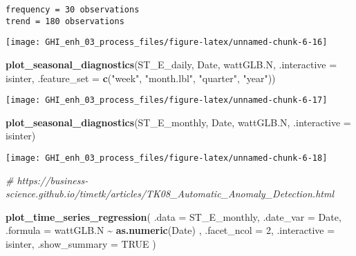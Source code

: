 \documentclass[
  10pt,
  a4paper,oneside]{article}
\newenvironment{Shaded}{\begin{snugshade}}{\end{snugshade}}
\newcommand{\AttributeTok}[1]{\textcolor[rgb]{0.13,0.29,0.53}{#1}}
\newcommand{\CommentTok}[1]{\textcolor[rgb]{0.56,0.35,0.01}{\textit{#1}}}
\newcommand{\ConstantTok}[1]{\textcolor[rgb]{0.56,0.35,0.01}{#1}}
\newcommand{\DecValTok}[1]{\textcolor[rgb]{0.00,0.00,0.81}{#1}}
\newcommand{\FunctionTok}[1]{\textcolor[rgb]{0.13,0.29,0.53}{\textbf{#1}}}
\newcommand{\NormalTok}[1]{#1}
\newcommand{\SpecialCharTok}[1]{\textcolor[rgb]{0.81,0.36,0.00}{\textbf{#1}}}
\newcommand{\StringTok}[1]{\textcolor[rgb]{0.31,0.60,0.02}{#1}}
\begin{document}
\begin{verbatim}
frequency = 30 observations
trend = 180 observations
\end{verbatim}

\begin{center}\texttt{[image: GHI\_enh\_03\_process\_files/figure-latex/unnamed-chunk-6-16]} \end{center}

\begin{Shaded}
\begin{Highlighting}[]
\FunctionTok{plot\_seasonal\_diagnostics}\NormalTok{(ST\_E\_daily, Date, wattGLB.N, }\AttributeTok{.interactive =}\NormalTok{ isinter,}
                          \AttributeTok{.feature\_set =} \FunctionTok{c}\NormalTok{(}\StringTok{"week"}\NormalTok{, }\StringTok{"month.lbl"}\NormalTok{, }\StringTok{"quarter"}\NormalTok{, }\StringTok{"year"}\NormalTok{))}
\end{Highlighting}
\end{Shaded}

\begin{center}\texttt{[image: GHI\_enh\_03\_process\_files/figure-latex/unnamed-chunk-6-17]} \end{center}

\begin{Shaded}
\begin{Highlighting}[]
\FunctionTok{plot\_seasonal\_diagnostics}\NormalTok{(ST\_E\_monthly, Date, wattGLB.N, }\AttributeTok{.interactive =}\NormalTok{ isinter)}
\end{Highlighting}
\end{Shaded}

\begin{center}\texttt{[image: GHI\_enh\_03\_process\_files/figure-latex/unnamed-chunk-6-18]} \end{center}

\begin{Shaded}
\begin{Highlighting}[]
\CommentTok{\# https://business{-}science.github.io/timetk/articles/TK08\_Automatic\_Anomaly\_Detection.html}

\FunctionTok{plot\_time\_series\_regression}\NormalTok{(}
    \AttributeTok{.data         =}\NormalTok{ ST\_E\_monthly,}
    \AttributeTok{.date\_var     =}\NormalTok{ Date,}
    \AttributeTok{.formula      =}\NormalTok{ wattGLB.N }\SpecialCharTok{\textasciitilde{}} \FunctionTok{as.numeric}\NormalTok{(Date)  ,}
    \AttributeTok{.facet\_ncol   =} \DecValTok{2}\NormalTok{,}
    \AttributeTok{.interactive  =}\NormalTok{ isinter,}
    \AttributeTok{.show\_summary =} \ConstantTok{TRUE}
\NormalTok{)}
\end{Highlighting}
\end{Shaded}
\end{document}
